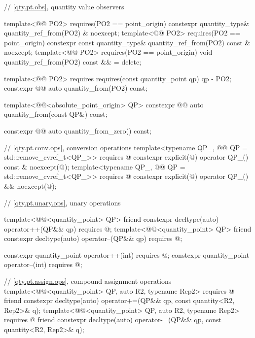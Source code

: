 \begin{codeblock}
{{  // \ref{qty.pt.obs}, quantity value observers

  template<@@ PO2>
    requires(PO2{} == point_origin)
  constexpr quantity_type& quantity_ref_from(PO2) & noexcept;
  template<@@ PO2>
    requires(PO2{} == point_origin)
  constexpr const quantity_type& quantity_ref_from(PO2) const & noexcept;
  template<@@ PO2>
    requires(PO2{} == point_origin)
  void quantity_ref_from(PO2) const && = delete;

  template<@@ PO2>
    requires requires(const quantity_point qp) { qp - PO2{}; }
  constexpr @@ auto quantity_from(PO2) const;

  template<@@<absolute_point_origin> QP>
  constexpr @@ auto quantity_from(const QP&) const;

  constexpr @@ auto quantity_from_zero() const;

  // \ref{qty.pt.conv.ops}, conversion operations
  template<typename QP_, @@ QP = std::remove_cvref_t<QP_>>
    requires @\seebelownc@
  constexpr explicit(@\seebelownc@) operator QP_() const & noexcept(@\seebelownc@);
  template<typename QP_, @@ QP = std::remove_cvref_t<QP_>>
    requires @\seebelownc@
  constexpr explicit(@\seebelownc@) operator QP_() && noexcept(@\seebelownc@);

  // \ref{qty.pt.unary.ops}, unary operations

  template<@@<quantity_point> QP>
  friend constexpr decltype(auto) operator++(QP&& qp)
    requires @\seebelownc@;
  template<@@<quantity_point> QP>
  friend constexpr decltype(auto) operator--(QP&& qp)
    requires @\seebelownc@;

  constexpr quantity_point operator++(int)
    requires @\seebelownc@;
  constexpr quantity_point operator--(int)
    requires @\seebelownc@;

  // \ref{qty.pt.assign.ops}, compound assignment operations
  template<@@<quantity_point> QP, auto R2, typename Rep2>
    requires @\seebelownc@
  friend constexpr decltype(auto) operator+=(QP&& qp, const quantity<R2, Rep2>& q);
  template<@@<quantity_point> QP, auto R2, typename Rep2>
    requires @\seebelownc@
  friend constexpr decltype(auto) operator-=(QP&& qp, const quantity<R2, Rep2>& q);

}}
\end{codeblock}
